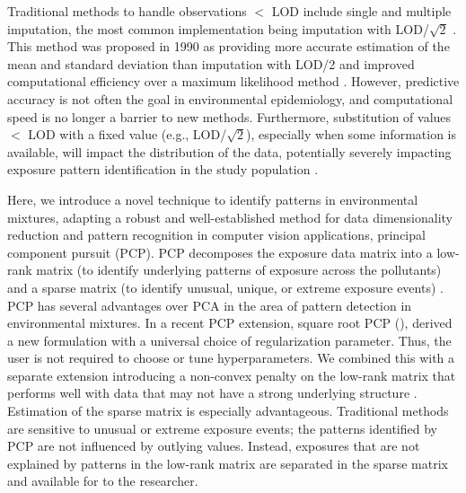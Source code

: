 Traditional methods to handle observations $<$ LOD include single and multiple imputation, the most common implementation being imputation with LOD/$\sqrt{2}$ \citep{barr2006survey}. This method was proposed in 1990 as providing more accurate estimation of the mean and standard deviation than imputation with LOD/2 and improved computational efficiency over a maximum likelihood method \citep{hornung1990estimation}. However, predictive accuracy is not often the goal in environmental epidemiology, and computational speed is no longer a barrier to new methods. Furthermore, substitution of values $<$ LOD with a fixed value (e.g., LOD/$\sqrt{2}$), especially when some information is available, will impact the distribution of the data, potentially severely impacting exposure pattern identification in the study population \citep{helsel1990less}.

Here, we introduce a novel technique to identify patterns in environmental mixtures, adapting a robust and well-established method for data dimensionality reduction and pattern recognition in computer vision applications, principal component pursuit (PCP). PCP decomposes the exposure data matrix into a low-rank matrix (to identify underlying patterns of exposure across the pollutants) and a sparse matrix (to identify unusual, unique, or extreme exposure events) \citep{candes2011robust}. PCP has several advantages over PCA in the area of pattern detection in environmental mixtures. In a recent PCP extension, square root PCP (\rootpcpc), \citet{cite_zhang} derived a new formulation with a universal choice of regularization parameter. Thus, the user is not required to choose or tune hyperparameters. We combined this with a separate extension introducing a non-convex penalty on the low-rank matrix that performs well with data that may not have a strong underlying structure \citep{netrapalli2014non, chen2020bridging}. Estimation of the sparse matrix is especially advantageous. Traditional methods are sensitive to unusual or extreme exposure events; the patterns identified by PCP are not influenced by outlying values. Instead, exposures that are not explained by patterns in the low-rank matrix are separated in the sparse matrix and available for to the researcher.

